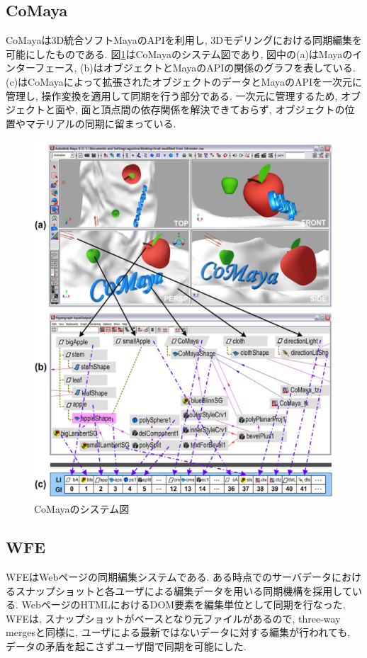 \subsection{CoMaya}
CoMayaは3D統合ソフトMayaのAPIを利用し, 3Dモデリングにおける同期編集を可能にしたものである.
図\ref{comayapng}はCoMayaのシステム図であり, 図中の(a)はMayaのインターフェース, (b)はオブジェクトとMayaのAPIの関係のグラフを表している. (c)はCoMayaによって拡張されたオブジェクトのデータとMayaのAPIを一次元に管理し, 操作変換を適用して同期を行う部分である.
一次元に管理するため, オブジェクトと面や, 面と頂点間の依存関係を解決できておらず, オブジェクトの位置やマテリアルの同期に留まっている.
\begin{figure}[htbp]
  \begin{center}
    \includegraphics[scale=0.6]{images/comaya}
    \caption{CoMayaのシステム図\cite{COMAYA}}
    \label{comayapng}
  \end{center}
\end{figure}
%
\subsection{WFE}
WFE\cite{WFE}はWebページの同期編集システムである. ある時点でのサーバデータにおけるスナップショットと各ユーザによる編集データを用いる同期機構を採用している. WebページのHTMLにおけるDOM要素を編集単位として同期を行なった. WFEは, スナップショットがベースとなり元ファイルがあるので, three-way mergesと同様に, ユーザによる最新ではないデータに対する編集が行われても, データの矛盾を起こさずユーザ間で同期を可能にした.
